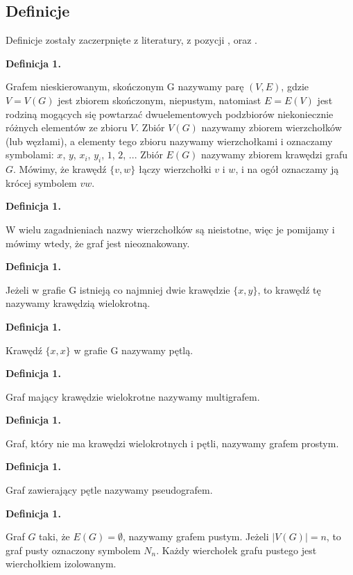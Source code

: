 \subsection{Definicje}
Definicje zostały zaczerpnięte z literatury, z pozycji \cite{Wloch2008}, \cite{Wilson2012} oraz \cite{Wojciechwoski2013}.

\newcommand{\graphDefinitionIndex}{1}
\newcommand{\incrementGraphDefinitionIndex} {
    \pgfmathtruncatemacro{\graphDefinitionIndex}{\graphDefinitionIndex + 1}
}

\noindent
\textbf{Definicja \graphDefinitionIndex.}
\incrementGraphDefinitionIndex
Grafem nieskierowanym, skończonym G nazywamy parę $(V,E)$, gdzie $V = V(G)$ jest zbiorem skończonym, niepustym,
natomiast $E = E(V)$ jest rodziną mogących się powtarzać dwuelementowych podzbiorów niekoniecznie różnych elementów ze zbioru $V$.
Zbiór $V(G)$ nazywamy zbiorem wierzchołków (lub węzłami), a elementy tego zbioru nazywamy wierzchołkami i oznaczamy symbolami:
$x$, $y$, $x_i$, $y_i$, $1$, $2$, ... Zbiór $E(G)$ nazywamy zbiorem krawędzi grafu $G$.
Mówimy, że krawędź $\{v, w\}$ łączy wierzchołki $v$ i $w$, i na ogół oznaczamy ją krócej symbolem $vw$.

\noindent
\textbf{Definicja \graphDefinitionIndex.}
\incrementGraphDefinitionIndex
W wielu zagadnieniach nazwy wierzchołków są nieistotne, więc je pomijamy i mówimy wtedy, że graf jest nieoznakowany.

\noindent
\textbf{Definicja \graphDefinitionIndex.}
\incrementGraphDefinitionIndex
Jeżeli w grafie G istnieją co najmniej dwie krawędzie $\{x, y\}$, to krawędź tę nazywamy krawędzią wielokrotną.

\noindent
\textbf{Definicja \graphDefinitionIndex.}
\incrementGraphDefinitionIndex
Krawędź $\{x, x\}$ w grafie G nazywamy pętlą.

\noindent
\textbf{Definicja \graphDefinitionIndex.}
\incrementGraphDefinitionIndex
Graf mający krawędzie wielokrotne nazywamy multigrafem.

\noindent
\textbf{Definicja \graphDefinitionIndex.}
\incrementGraphDefinitionIndex
Graf, który nie ma krawędzi wielokrotnych i pętli, nazywamy grafem prostym.

\noindent
\textbf{Definicja \graphDefinitionIndex.}
\incrementGraphDefinitionIndex
Graf zawierający pętle nazywamy pseudografem.

\noindent
\textbf{Definicja \graphDefinitionIndex.}
\incrementGraphDefinitionIndex
Graf $G$ taki, że $E(G) = \emptyset$, nazywamy grafem pustym. Jeżeli $|V(G)| = n$, to graf pusty oznaczony symbolem $N_n$.
Każdy wierchołek grafu pustego jest wierchołkiem izolowanym.

